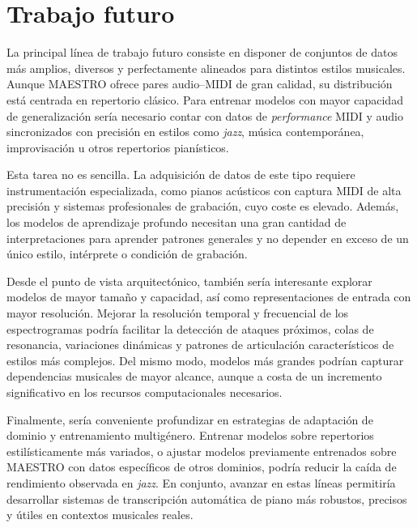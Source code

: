 \documentclass[11pt,spanish,listoffigures,listoftables]{tfgetsinf}
\begin{document}
\section{Trabajo futuro}

La principal línea de trabajo futuro consiste en disponer de conjuntos de datos más amplios, diversos y
perfectamente alineados para distintos estilos musicales. Aunque MAESTRO ofrece pares audio--MIDI de
gran calidad, su distribución está centrada en repertorio clásico. Para entrenar modelos con mayor
capacidad de generalización sería necesario contar con datos de \textit{performance} MIDI y audio sincronizados con precisión
en estilos como \textit{jazz}, música contemporánea, improvisación u otros repertorios pianísticos.

Esta tarea no es sencilla. La adquisición de datos de este tipo requiere instrumentación especializada,
como pianos acústicos con captura MIDI de alta precisión y sistemas profesionales de grabación, cuyo coste
es elevado. Además, los modelos de aprendizaje profundo necesitan una gran cantidad de interpretaciones para
aprender patrones generales y no depender en exceso de un único estilo, intérprete o condición de grabación.

Desde el punto de vista arquitectónico, también sería interesante explorar modelos de mayor tamaño y capacidad,
así como representaciones de entrada con mayor resolución. Mejorar la resolución temporal y frecuencial de los
espectrogramas podría facilitar la detección de ataques próximos, colas de resonancia, variaciones dinámicas y
patrones de articulación característicos de estilos más complejos. Del mismo modo, modelos más grandes podrían
capturar dependencias musicales de mayor alcance, aunque a costa de un incremento significativo en los recursos
computacionales necesarios.

Finalmente, sería conveniente profundizar en estrategias de adaptación de dominio y entrenamiento multigénero.
Entrenar modelos sobre repertorios estilísticamente más variados, o ajustar modelos previamente entrenados sobre
MAESTRO con datos específicos de otros dominios, podría reducir la caída de rendimiento observada en \textit{jazz}.
En conjunto, avanzar en estas líneas permitiría desarrollar sistemas de transcripción automática de piano más robustos,
precisos y útiles en contextos musicales reales.

\end{document}
